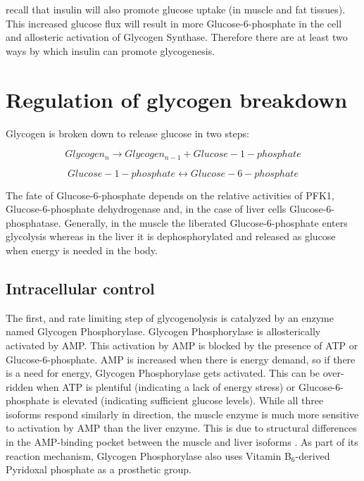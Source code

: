 \documentclass{tufte-handout}
\begin{document}
 recall that insulin will also promote glucose uptake (in muscle and fat tissues).  This increased glucose flux will result in more Glucose-6-phosphate in the cell and allosteric activation of Glycogen Synthase.  Therefore there are at least two ways by which insulin can promote glycogenesis.

\section{Regulation of glycogen breakdown}

Glycogen is broken down to release glucose in two steps:

\begin{equation}
Glycogen_{n} \rightarrow Glycogen_{n-1} + Glucose-1-phosphate
\end{equation}

\begin{equation}
Glucose-1-phosphate \leftrightarrow Glucose-6-phosphate
\end{equation}

The fate of Glucose-6-phosphate depends on the relative activities of PFK1, Glucose-6-phosphate dehydrogenase and, in the case of liver cells Glucose-6-phosphatase.  Generally, in the muscle the liberated Glucose-6-phosphate enters glycolysis whereas in the liver it is dephosphorylated and released as glucose when energy is needed in the body.

\subsection{Intracellular control}

The first, and rate limiting step of glycogenolysis is catalyzed by an enzyme named Glycogen Phosphorylase.  Glycogen Phosphorylase is allosterically activated by AMP.  This activation by AMP is blocked by the presence of ATP or Glucose-6-phosphate.  AMP is increased when there is energy demand, so if there is a need for energy, Glycogen Phosphorylase gets activated.  This can be over-ridden when ATP is plentiful (indicating a lack of energy stress) or Glucose-6-phosphate is elevated (indicating sufficient glucose levels).  While all three isoforms respond similarly in direction, the muscle enzyme is much more sensitive to activation by AMP than the liver enzyme.  This is due to structural differences in the AMP-binding pocket between the muscle and liver isoforms \citep{Rath2000}.  As part of its reaction mechanism, Glycogen Phosphorylase also uses Vitamin B$_6$-derived Pyridoxal phosphate as a prosthetic group.
\end{document}
